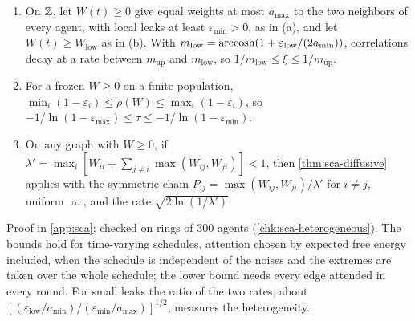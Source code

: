 \begin{proposition}
\begin{enumerate}
\item[(c)] On $\mathbb{Z}$, let $W(t)\ge0$ give equal weights at most $a_{\max}$ to the two neighbors of every agent, with local leaks at least $\varepsilon_{\min}>0$, as in (a), and let $W(t)\ge W_{\mathrm{low}}$ as in (b). With $m_{\mathrm{low}}=\operatorname{arccosh}(1+\varepsilon_{\mathrm{low}}/(2a_{\min}))$, correlations decay at a rate between $m_{\mathrm{up}}$ and $m_{\mathrm{low}}$, so $1/m_{\mathrm{low}}\le\xi\le1/m_{\mathrm{up}}$.
\item[(d)] For a frozen $W\ge0$ on a finite population, $\min_i(1-\varepsilon_i)\le\rho(W)\le\max_i(1-\varepsilon_i)$, so $-1/\ln(1-\varepsilon_{\max})\le\tau\le-1/\ln(1-\varepsilon_{\min})$.
\item[(e)] On any graph with $W\ge0$, if $\lambda'=\max_i[W_{ii}+\sum_{j\neq i}\max(W_{ij},W_{ji})]<1$, then \cref{thm:sca-diffusive} applies with the symmetric chain $P_{ij}=\max(W_{ij},W_{ji})/\lambda'$ for $i\neq j$, uniform $\varpi$, and the rate $\sqrt{2\ln(1/\lambda')}$.
\end{enumerate}
\end{proposition}
Proof in \cref{app:sca}; checked on rings of 300 agents (\cref{chk:sca-heterogeneous}). The bounds hold for time-varying schedules, attention chosen by expected free energy included, when the schedule is independent of the noises and the extremes are taken over the whole schedule; the lower bound needs every edge attended in every round. For small leaks the ratio of the two rates, about $[(\varepsilon_{\mathrm{low}}/a_{\min})/(\varepsilon_{\min}/a_{\max})]^{1/2}$, measures the heterogeneity.


